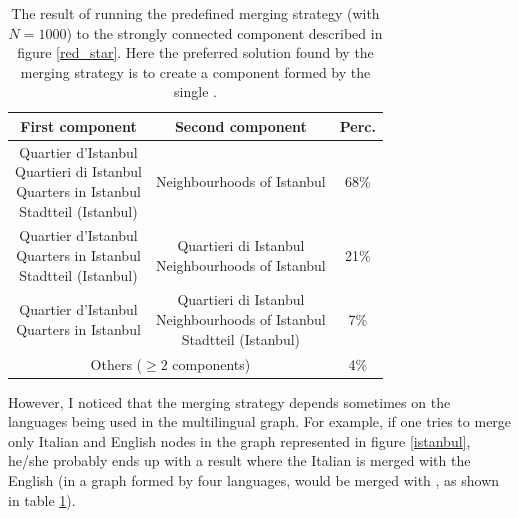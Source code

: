             \begin{table}[h]
                \centering
                \begin{tabular}{|c|c|c|}
                    \hline
                    First component & Second component & Perc. \\ \hline \hline
                    \makecell{Quartier d'Istanbul\\Quartieri di Istanbul\\Quarters in Istanbul\\Stadtteil (Istanbul)} & Neighbourhoods of Istanbul & 68\%\\ \hline
                    \makecell{Quartier d'Istanbul\\Quarters in Istanbul\\Stadtteil (Istanbul)} & \makecell{Quartieri di Istanbul\\Neighbourhoods of Istanbul} & 21\%\\ \hline
                    \makecell{Quartier d'Istanbul\\Quarters in Istanbul} & \makecell{Quartieri di Istanbul\\Neighbourhoods of Istanbul\\Stadtteil (Istanbul)} & 7\%\\ \hline
                    \multicolumn{2}{|c|}{Others (\(\ge 2\) components)} & 4\% \\ \hline
                \end{tabular}
                \caption{The result of running the predefined merging strategy (with \(N=1000\)) to the strongly connected component described in figure \ref{red_star}. Here the preferred solution found by the merging strategy is to create a component formed by the single .}
                \label{results_merging_istanbul}
            \end{table}
        
            However, I noticed that the merging strategy depends sometimes on the languages being used in the multilingual graph. For example, if one tries to merge only Italian and English nodes in the graph represented in figure \ref{istanbul}, he/she probably ends up with a result where the Italian  is merged with the English  (in a graph formed by four languages,  would be merged with , as shown in table \ref{results_merging_istanbul}).
        
